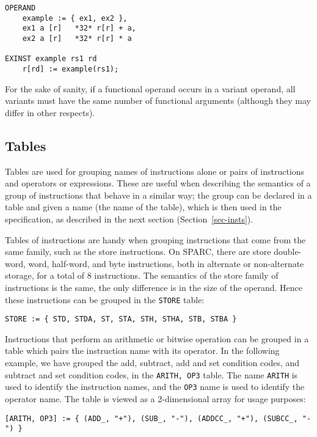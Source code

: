 {\small
\begin{verbatim}
OPERAND
    example := { ex1, ex2 },
    ex1 a [r]   *32* r[r] + a,
    ex2 a [r]   *32* r[r] * a

EXINST example rs1 rd
    r[rd] := example(rs1);
\end{verbatim} }

For the sake of sanity, if a functional operand occurs in a variant operand,
all variants must have the same number of functional arguments (although they
may differ in other respects). 

\subsection{Tables}
\label{sec-tables}
Tables are used for grouping names of instructions alone or pairs of
instructions and operators or expressions.  These are useful when
describing the semantics of a group of instructions that behave
in a similar way; the group can be declared in a table and given
a name (the name of the table), which is then used in the 
specification, as described in the next section (Section~\ref{sec-insts}).

Tables of instructions are handy when grouping instructions that
come from the same family, such as the store instructions.
On SPARC, there are store double-word, word, half-word, and byte 
instructions, both in alternate or non-alternate storage, for a total of 
8 instructions.  The semantics of the store family of instructions is
the same, the only difference is in the size of the operand.  Hence
these instructions can be grouped in the \texttt{STORE} table:
\begin{verbatim}
STORE := { STD, STDA, ST, STA, STH, STHA, STB, STBA }
\end{verbatim}

Instructions that perform an arithmetic or bitwise operation can be
grouped in a table which pairs the instruction name with its operator.
In the following example, we have grouped the add, subtract, add and 
set condition codes, and subtract and set condition codes, in the
\texttt{ARITH, OP3} table.  The name \texttt{ARITH} is used to 
identify the instruction names, and the \texttt{OP3} name is used to
identify the operator name.  The table is viewed as a 2-dimensional
array for usage purposes:
\begin{verbatim}
[ARITH, OP3] := { (ADD_, "+"), (SUB_, "-"), (ADDCC_, "+"), (SUBCC_, "-") }
\end{verbatim}

